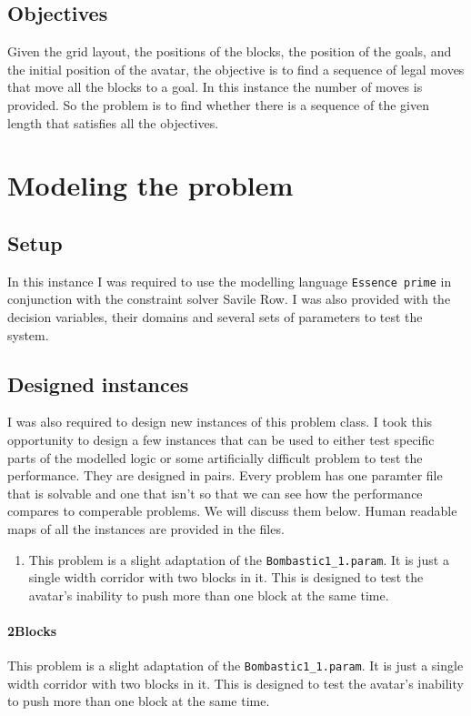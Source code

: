 \documentclass[british]{article}
\newcommand{\code}[1]{\texttt{#1}}
\begin{document}
\subsection{Objectives}
Given the grid layout, the positions of the blocks, the position of the goals, and the initial position of the avatar, the objective is to find a sequence of legal moves that move all the blocks to a goal. In this instance the number of moves is provided. So the problem is to find whether there is a sequence of the given length that satisfies all the objectives. 


\section{Modeling the problem}
\label{model}
\subsection{Setup}
In this instance I was required to use the modelling language \code{Essence prime} in conjunction with the constraint solver Savile Row. I was also provided with the decision variables, their domains and several sets of parameters to test the system.   

\subsection{Designed instances}
I was also required to design new instances of this problem class. I took this opportunity to design a few instances that can be used to either test specific parts of the modelled logic or some artificially difficult problem to test the performance. They are designed in pairs. Every problem has one paramter file that is solvable and one that isn't so that we can see how the performance compares to comperable problems. We will discuss them below. Human readable maps of all the instances are provided in the files. 
\begin{enumerate}[10)]
	\item This problem is a slight adaptation of the \code{Bombastic1\_1.param}. It is just a single width corridor with two blocks in it. This is designed to test the avatar's inability to push more than one block at the same time.
\end{enumerate}
	\paragraph{2Blocks} This problem is a slight adaptation of the \code{Bombastic1\_1.param}. It is just a single width corridor with two blocks in it. This is designed to test the avatar's inability to push more than one block at the same time. 
\end{document}
